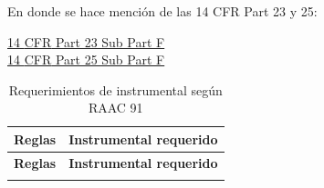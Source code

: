 En donde se hace mención de las 14 \ac{CFR} Part 23 y 25:

\begin{description}
\item[\href{https://www.law.cornell.edu/cfr/text/14/part-23/subpart-F}{14 \ac{CFR} Part 23 Sub Part F}]
\item[\href{https://www.law.cornell.edu/cfr/text/14/part-25/subpart-F}{14 \ac{CFR} Part 25 Sub Part F}] 
\end{description}

\newpage

  \begin{longtable}{m{}m{}}
    \caption{Requerimientos de instrumental seg\'un RAAC 91}
    \label{tab:01.requerimientos.instrumentos.RAAC.91} \\  \hline \rowcolor{bubbles}

      {\bf Reglas} & {\bf Instrumental requerido} \\ \hline \endfirsthead  \hline \rowcolor{bubbles}
      {\bf Reglas} & {\bf Instrumental requerido} \\ \hline \endhead

	\hline \endfoot  \hline \endlastfoot



\end{longtable}

